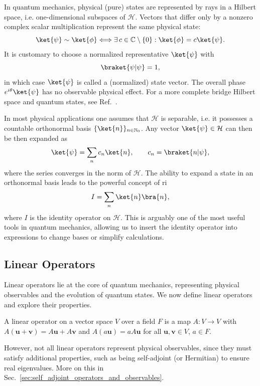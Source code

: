 In quantum mechanics, physical (pure) states are represented by rays in a Hilbert space, i.e. one-dimensional subspaces of $\mathcal{H}$. Vectors that differ only by a nonzero complex scalar multiplication represent the same physical state:
\begin{equation}
\ket{\psi}\sim\ket{\phi}\Longleftrightarrow\exists\,c\in\mathbb{C}\setminus\lbrace 0\rbrace:\ket{\phi}=c\ket{\psi}.
\end{equation}
It is customary to choose a normalized representative $\ket{\psi}$ with
\begin{equation}
\braket{\psi\vert\psi}=1,
\end{equation}
in which case $\ket{\psi}$ is called a (normalized) state vector. The overall phase $e^{i\theta}\ket{\psi}$ has no observable physical effect. For a more complete bridge Hilbert space and quantum states, see Ref.~\cite{1021172445}.

In most physical applications one assumes that $\mathcal{H}$ is separable, i.e. it possesses a countable orthonormal basis $\lbrace\ket{n}\rbrace_{n\in\mathbb{N}_0}$. Any vector $\ket{\psi}\in\mathcal{H}$ can then be then expanded as
\begin{equation}
\ket{\psi}=\sum_{n}c_n\ket{n},\qquad c_n=\braket{n\vert\psi},
\end{equation}
where the series converges in the norm of $\mathcal{H}$. The ability to expand a state in an orthonormal basis leads to the powerful concept of \acrfull{ri}
\begin{equation}
I=\sum_{n}\ket{n}\bra{n},
\end{equation}
where $I$ is the identity operator on $\mathcal{H}$. This is arguably one of the most useful tools in quantum mechanics, allowing us to insert the identity operator into expressions to change bases or simplify calculations.
\subsection{Linear Operators}\label{sec:linear_operators}
Linear operators lie at the core of quantum mechanics, representing physical observables and the evolution of quantum states. We now define linear operators and explore their properties.
\begin{definition}
A linear operator on a vector space $V$ over a field $F$ is a map $A:V\to V$ with $A(\symbf{u}+\symbf{v})=A\symbf{u}+A\symbf{v}$ and $A(a\symbf{u})=aA\symbf{u}$ for all $\symbf{u},\symbf{v}\in V$, $a\in F$.
\end{definition}
However, not all linear operators represent physical observables, since they must satisfy additional properties, such as being self-adjoint (or Hermitian) to ensure real eigenvalues. More on this in Sec.~\ref{sec:self_adjoint_operators_and_observables}.

